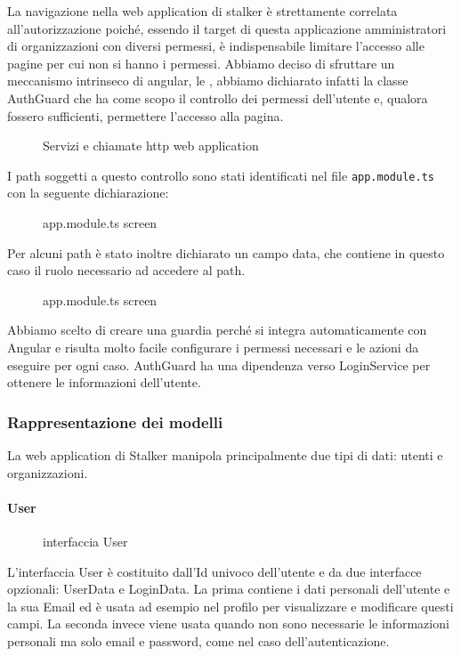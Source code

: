 \documentclass[../../manuale-manutentore.tex]{subfiles}
\begin{document}
La navigazione nella web application di stalker è strettamente correlata all'autorizzazione poiché, essendo il target di questa applicazione amministratori di organizzazioni con diversi permessi, è indispensabile limitare l'accesso alle pagine per cui non si hanno i permessi.
Abbiamo deciso di sfruttare un meccanismo intrinseco di angular, le , abbiamo dichiarato infatti la classe AuthGuard che ha come scopo il controllo dei permessi dell'utente e, qualora fossero sufficienti, permettere l'accesso alla pagina.
\begin{figure}[H]
  \centering
  \caption{Servizi e chiamate http web application}%
  \label{fig:web-app-authguard}
\end{figure}
I path soggetti a questo controllo sono stati identificati nel file \texttt{app.module.ts} con la seguente dichiarazione:
\begin{figure}[H]
  \centering
  \caption{app.module.ts screen}%
  \label{fig:web-app-appmodule-screen-1}
\end{figure}

Per alcuni path è stato inoltre dichiarato un campo data, che contiene in questo caso il ruolo necessario ad accedere al path.
\begin{figure}[H]
  \centering
  \caption{app.module.ts screen}%
  \label{fig:web-app-appmodule-screen-2}
\end{figure}
Abbiamo scelto di creare una guardia perché si integra automaticamente con Angular e risulta molto facile configurare i permessi necessari e le azioni da eseguire per ogni caso.
AuthGuard ha una dipendenza verso LoginService per ottenere le informazioni dell'utente.


\subsubsection{Rappresentazione dei modelli}%
\label{subs:modelli}

La web application di Stalker manipola principalmente due tipi di dati: utenti e organizzazioni.
\paragraph{User}%
\label{par:webapp/user}
\begin{figure}[H]
  \centering
  \caption{interfaccia User}%
  \label{fig:web-app-user}
\end{figure}
L'interfaccia User è costituito dall'Id univoco dell'utente e da due interfacce opzionali: UserData e LoginData.
La prima contiene i dati personali dell'utente e la sua Email ed è usata ad esempio nel profilo per visualizzare e modificare questi campi.
La seconda invece viene usata quando non sono necessarie le informazioni personali ma solo email e password, come nel caso dell'autenticazione.
\end{document}
